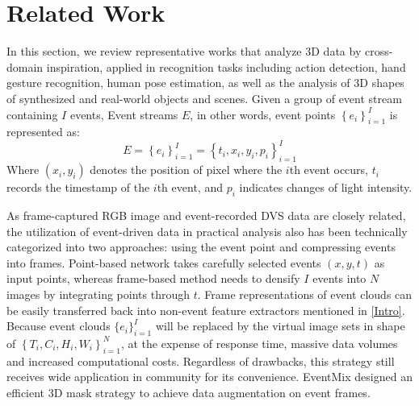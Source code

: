 \section{Related Work}
\label{related}
In this section, we review representative works that analyze 3D data by cross-domain inspiration, applied in recognition tasks including action detection, hand gesture recognition, human pose estimation, as well as the analysis of 3D shapes of synthesized and real-world objects and scenes. Given a group of event stream containing $I$ events, Event streams $E$, in other words, event points $\left\{e_i\right\}^{I}_{i=1}$ is represented as:
\begin{equation}\label{dvs_data}
    E = \left\{e_i\right\}^{I}_{i=1} = \left\{t_i,x_i,y_i,p_i \right\}_{i=1}^I
\end{equation} 
Where $(x_i,y_i)$ denotes the position of pixel where the $i$th event occurs, $t_i$ records the timestamp of the $i$th event, and $p_i$ indicates changes of light intensity. 

As frame-captured RGB image and event-recorded DVS data are closely related, the utilization of event-driven data in practical analysis also has been technically categorized into two approaches: using the event point and compressing events into frames. Point-based network takes carefully selected events $(x,y,t)$ as input points, whereas frame-based method needs to densify $I$ events into $N$ images by integrating points through $t$. Frame representations of event clouds can be easily transferred back into non-event feature extractors mentioned in \cref{Intro}. Because event clouds $\{e_i\}_{i=1}^I$ will be replaced by the virtual image sets in shape of $\left\{T_i, C_i, H_i, W_i\right\}_{i=1}^N$, at the expense of response time, massive data volumes and increased computational costs. Regardless of drawbacks, this strategy still receives wide application in community for its convenience. EventMix \cite{shen2023eventmix} designed an efficient 3D mask strategy to achieve data augmentation on event frames.
